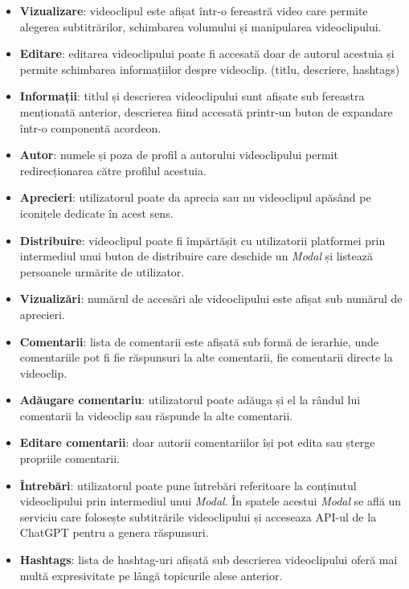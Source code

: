 \begin{itemize}
    \item \textbf{Vizualizare}: videoclipul este afișat într-o fereastră video care
    permite alegerea subtitrărilor, schimbarea volumului și manipularea videoclipului.
    \item \textbf{Editare}: editarea videoclipului poate fi accesată doar de autorul acestuia
    și permite schimbarea informațiilor despre videoclip. (titlu, descriere, hashtags)
    \item \textbf{Informații}: titlul și descrierea videoclipului sunt afișate sub fereastra
    menționată anterior, descrierea fiind accesată printr-un buton de expandare într-o componentă
    acordeon.
    \item \textbf{Autor}: numele și poza de profil a autorului videoclipului permit
    redirecționarea către profilul acestuia.
    \item \textbf{Aprecieri}: utilizatorul poate da aprecia sau nu videoclipul apăsând pe
    iconițele dedicate în acest sens.
    \item \textbf{Distribuire}: videoclipul poate fi împărtășit cu utilizatorii platformei
    prin intermediul unui buton de distribuire care deschide un \textit{Modal} și listează
    persoanele urmărite de utilizator.
    \item \textbf{Vizualizări}: numărul de accesări ale videoclipului este afișat sub numărul
    de aprecieri.
    \item \textbf{Comentarii}: lista de comentarii este afișată sub formă de ierarhie, unde
    comentariile pot fi fie răspunsuri la alte comentarii, fie comentarii directe la videoclip.
    \item \textbf{Adăugare comentariu}: utilizatorul poate adăuga și el la rândul lui comentarii la videoclip
    sau răspunde la alte comentarii.
    \item \textbf{Editare comentarii}: doar autorii comentariilor își pot edita sau șterge propriile comentarii.
    \item \textbf{Întrebări}: utilizatorul poate pune întrebări referitoare la conținutul videoclipului
    prin intermediul unui \textit{Modal}. În spatele acestui \textit{Modal} se află un serviciu care
    folosește subtitrările videoclipului și acceseaza API-ul de la ChatGPT pentru a genera răspunsuri.
    \item \textbf{Hashtags}: lista de hashtag-uri afișată sub descrierea videoclipului oferă mai
    multă expresivitate pe lângă topicurile alese anterior.
\end{itemize}

